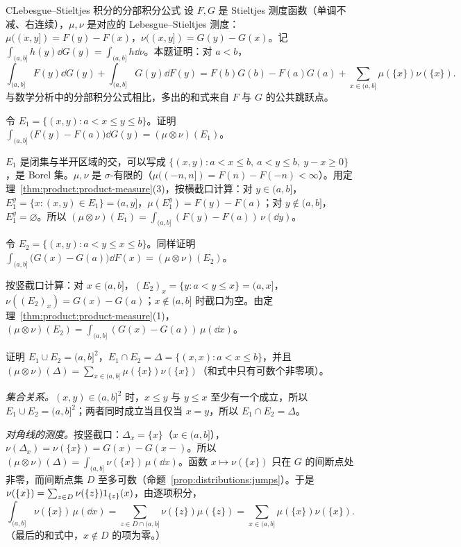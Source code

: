 \begin{probleme}{C}{Lebesgue--Stieltjes 积分的分部积分公式}
设 $F,G$ 是 Stieltjes 测度函数（单调不减、右连续），$\mu,\nu$ 是对应的 Lebesgue--Stieltjes 测度：$\mu((x,y])=F(y)-F(x)$，$\nu((x,y])=G(y)-G(x)$。记 $\int_{(a,b]}h(y)\dd G(y)=\int_{(a,b]}h\dd\nu$。本题证明：对 $a<b$，
\[
\int_{(a,b]}F(y)\dd G(y)+\int_{(a,b]}G(y)\dd F(y)=F(b)G(b)-F(a)G(a)+\sum_{x\in(a,b]}\mu(\{x\})\nu(\{x\}).
\]
与数学分析中的分部积分公式相比，多出的和式来自 $F$ 与 $G$ 的公共跳跃点。
\begin{questions}
\item 令 $E_1=\{(x,y):a<x\leqslant y\leqslant b\}$。证明 $\int_{(a,b]}\bigl(F(y)-F(a)\bigr)\dd G(y)=(\mu\otimes\nu)(E_1)$。
\begin{solution}
$E_1$ 是闭集与半开区域的交，可以写成 $\{(x,y):a<x\leqslant b,\ a<y\leqslant b,\ y-x\geqslant0\}$，是 Borel 集。$\mu,\nu$ 是 $\sigma$-有限的（$\mu((-n,n])=F(n)-F(-n)<\infty$）。用定理~\ref{thm:product:product-measure}(3)，按横截口计算：对 $y\in(a,b]$，$E_1^y=\{x:(x,y)\in E_1\}=(a,y]$，$\mu(E_1^y)=F(y)-F(a)$；对 $y\notin(a,b]$，$E_1^y=\varnothing$。所以 $(\mu\otimes\nu)(E_1)=\int_{(a,b]}(F(y)-F(a))\,\nu(\dd y)$。
\end{solution}

\item 令 $E_2=\{(x,y):a<y\leqslant x\leqslant b\}$。同样证明 $\int_{(a,b]}\bigl(G(x)-G(a)\bigr)\dd F(x)=(\mu\otimes\nu)(E_2)$。
\begin{solution}
按竖截口计算：对 $x\in(a,b]$，$(E_2)_x=\{y:a<y\leqslant x\}=(a,x]$，$\nu((E_2)_x)=G(x)-G(a)$；$x\notin(a,b]$ 时截口为空。由定理~\ref{thm:product:product-measure}(1)，$(\mu\otimes\nu)(E_2)=\int_{(a,b]}(G(x)-G(a))\,\mu(\dd x)$。
\end{solution}

\item 证明 $E_1\cup E_2=(a,b]^2$，$E_1\cap E_2=\Delta=\{(x,x):a<x\leqslant b\}$，并且 $(\mu\otimes\nu)(\Delta)=\sum_{x\in(a,b]}\mu(\{x\})\nu(\{x\})$（和式中只有可数个非零项）。
\begin{solution}
\emph{集合关系。}$(x,y)\in(a,b]^2$ 时，$x\leqslant y$ 与 $y\leqslant x$ 至少有一个成立，所以 $E_1\cup E_2=(a,b]^2$；两者同时成立当且仅当 $x=y$，所以 $E_1\cap E_2=\Delta$。

\emph{对角线的测度。}按竖截口：$\Delta_x=\{x\}$（$x\in(a,b]$），$\nu(\Delta_x)=\nu(\{x\})=G(x)-G(x-)$。所以 $(\mu\otimes\nu)(\Delta)=\int_{(a,b]}\nu(\{x\})\,\mu(\dd x)$。函数 $x\mapsto\nu(\{x\})$ 只在 $G$ 的间断点处非零，而间断点集 $D$ 至多可数（命题~\ref{prop:distributions:jumps}）。于是 $\nu(\{x\})=\sum_{z\in D}\nu(\{z\})1_{\{z\}}(x)$，由逐项积分，
\[
\int_{(a,b]}\nu(\{x\})\,\mu(\dd x)=\sum_{z\in D\cap(a,b]}\nu(\{z\})\mu(\{z\})=\sum_{x\in(a,b]}\mu(\{x\})\nu(\{x\}).
\]
（最后的和式中，$x\notin D$ 的项为零。）
\end{solution}


\end{questions}
\end{probleme}
